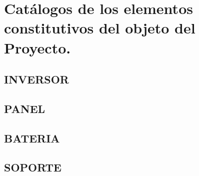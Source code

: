 \documentclass{article}
\begin{document}

\section*{Catálogos de los elementos constitutivos del objeto del Proyecto.}
\subsection*{INVERSOR}

\subsection*{PANEL}

\subsection*{BATERIA}

\subsection*{SOPORTE}


% 
% 





\end{document}
